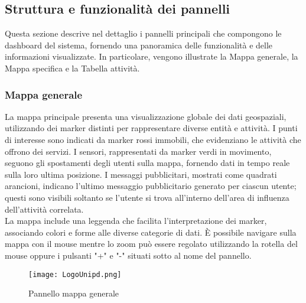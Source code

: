 \documentclass[10pt]{article}
\begin{document}
\begin{justify}
\subsection{Struttura e funzionalità dei pannelli}
Questa sezione descrive nel dettaglio i pannelli principali che compongono le dashboard del sistema, fornendo una panoramica delle funzionalità e delle informazioni visualizzate. In particolare, vengono illustrate la Mappa generale, la Mappa specifica e la Tabella attività.

    \subsubsection{Mappa generale}
    La mappa principale presenta una visualizzazione globale dei dati geospaziali, utilizzando dei marker distinti per rappresentare diverse entità e attività. I punti di interesse sono indicati da marker rossi immobili, che evidenziano le attività che offrono dei servizi. I sensori, rappresentati da marker verdi in movimento, seguono gli spostamenti degli utenti sulla mappa, fornendo dati in tempo reale sulla loro ultima posizione. I messaggi pubblicitari, mostrati come quadrati arancioni, indicano l'ultimo messaggio pubblicitario generato per ciascun utente; questi sono visibili soltanto se l'utente si trova all'interno dell'area di influenza dell'attività correlata.\\ 
    La mappa include una leggenda che facilita l'interpretazione dei marker, associando colori e forme alle diverse categorie di dati. È possibile navigare sulla mappa con il mouse mentre lo zoom può essere regolato utilizzando la rotella del mouse oppure i pulsanti "+" e "-" situati sotto al nome del pannello.
    \begin{figure}[H]
    \centering
    \texttt{[image: LogoUnipd.png]}
    \caption{Pannello mappa generale}
    \end{figure}


\end{justify}
\end{document}
